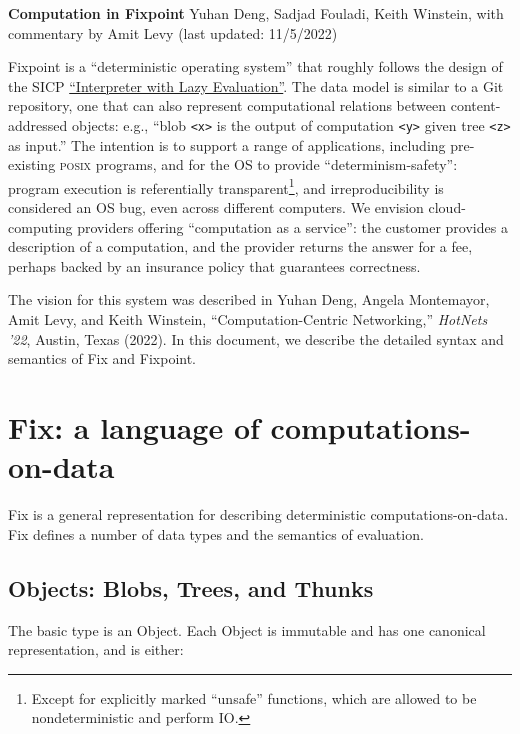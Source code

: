 \documentclass{article}
\newcommand{\blobs}{\textrm{Blob}s\xspace}
\newcommand{\object}{\textrm{Object}\xspace}
\newcommand{\objects}{\textrm{Object}s\xspace}
\newcommand{\thunks}{\textrm{Thunk}s\xspace}
\newcommand{\trees}{\textrm{Tree}s\xspace}
\newcommand{\bs}{\vspace{\baselineskip}}
\begin{document}
\thispagestyle{empty}

\textbf{Computation in Fixpoint}\newline
Yuhan Deng, Sadjad Fouladi, Keith Winstein, with commentary by Amit Levy (last updated: 11/5/2022)

\bs

Fixpoint is a ``deterministic operating system'' that roughly follows
the design of the SICP
\href{https://mitp-content-server.mit.edu/books/content/sectbyfn/books_pres_0/6515/sicp.zip/full-text/book/book-Z-H-27.html#%_sec_4.2.2}{``Interpreter
  with Lazy Evaluation''}. The data model is similar to a Git
repository, one that can also represent computational relations
between content-addressed objects: e.g., ``blob \texttt{<x>} is the
output of computation \texttt{<y>} given tree \texttt{<z>} as input.''
The intention is to support a range of applications, including
pre-existing \textsc{posix} programs, and for the OS to provide
``determinism-safety'': program execution is referentially
transparent\footnote{Except for explicitly marked ``unsafe''
functions, which are allowed to be nondeterministic and perform IO.},
and irreproducibility is considered an OS bug, even across different
computers. We envision cloud-computing providers offering
``computation as a service'': the customer provides a description of a
computation, and the provider returns the answer for a fee, perhaps
backed by an insurance policy that guarantees correctness.

\bs

The vision for this system was described in Yuhan Deng, Angela
Montemayor, Amit Levy, and Keith Winstein, ``Computation-Centric
Networking,'' \textit{HotNets '22}, Austin, Texas (2022). In this
document, we describe the detailed syntax and semantics of Fix and
Fixpoint.

\section{Fix: a language of computations-on-data}

Fix is a general representation for describing deterministic
computations-on-data. Fix defines a number of data types and the
semantics of evaluation.

\subsection{\objects: \blobs, \trees, and \thunks}

The basic type is an \object. Each \object is immutable and has one canonical representation, and is either:
\end{document}
